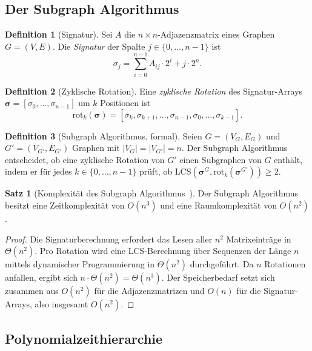 ﻿\documentclass[a4paper,12pt]{article}
\theoremstyle{definition}
\newtheorem{definition}{Definition}
\newtheorem{satz}{Satz}
\begin{document}
\subsection{Der Subgraph Algorithmus}

\begin{definition}[Signatur]
  Sei $A$ die $n \times n$-Adjazenzmatrix eines Graphen $G = (V, E)$.
  Die \emph{Signatur} der Spalte $j \in \{0, \ldots, n-1\}$ ist
  \[
    \sigma_j = \sum_{i=0}^{n-1} A_{ij} \cdot 2^i + j \cdot 2^n.
  \]
\end{definition}

\begin{definition}[Zyklische Rotation]
  Eine \emph{zyklische Rotation} des Signatur-Arrays
  $\boldsymbol{\sigma} = [\sigma_0, \ldots, \sigma_{n-1}]$ um $k$ Positionen ist
  \[
    \mathrm{rot}_k(\boldsymbol{\sigma}) = [\sigma_k, \sigma_{k+1}, \ldots, \sigma_{n-1},
    \sigma_0, \ldots, \sigma_{k-1}].
  \]
\end{definition}

\begin{definition}[Subgraph Algorithmus, formal]
\label{def:algo}
  Seien $G = (V_G, E_G)$ und $G' = (V_{G'}, E_{G'})$ Graphen mit $|V_G| = |V_{G'}| = n$.
  Der Subgraph Algorithmus entscheidet, ob eine zyklische Rotation von $G'$ einen Subgraphen
  von $G$ enthält, indem er für jedes $k \in \{0, \ldots, n-1\}$ prüft, ob
  $\mathrm{LCS}(\boldsymbol{\sigma}^G, \mathrm{rot}_k(\boldsymbol{\sigma}^{G'})) \geq 2$.
\end{definition}

\begin{satz}[Komplexität des Subgraph Algorithmus~\cite{epp2026subgraph}]
\label{satz:komplex}
  Der Subgraph Algorithmus besitzt eine Zeitkomplexität von $O(n^3)$
  und eine Raumkomplexität von $O(n^2)$.
\end{satz}

\begin{proof}
  Die Signaturberechnung erfordert das Lesen aller $n^2$ Matrixeinträge
  in $\Theta(n^2)$.
  Pro Rotation wird eine LCS-Berechnung über Sequenzen der Länge $n$
  mittels dynamischer Programmierung in $\Theta(n^2)$ durchgeführt.
  Da $n$ Rotationen anfallen, ergibt sich $n \cdot \Theta(n^2) = \Theta(n^3)$.
  Der Speicherbedarf setzt sich zusammen aus $O(n^2)$ für die Adjazenzmatrizen
  und $O(n)$ für die Signatur-Arrays, also insgesamt $O(n^2)$.
\end{proof}

\subsection{Polynomialzeithierarchie}
\end{document}
